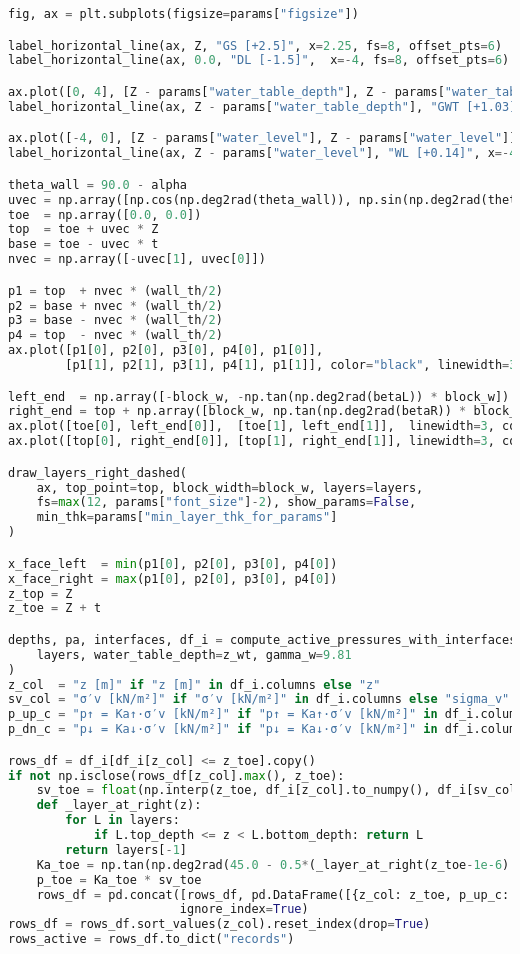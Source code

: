 \begin{lstlisting}[language=Python]
fig, ax = plt.subplots(figsize=params["figsize"])

label_horizontal_line(ax, Z, "GS [+2.5]", x=2.25, fs=8, offset_pts=6)
label_horizontal_line(ax, 0.0, "DL [-1.5]",  x=-4, fs=8, offset_pts=6)

ax.plot([0, 4], [Z - params["water_table_depth"], Z - params["water_table_depth"]], linestyle="--", linewidth=1.5, color="black")
label_horizontal_line(ax, Z - params["water_table_depth"], "GWT [+1.03]", x=2.25, fs=8, offset_pts=6)

ax.plot([-4, 0], [Z - params["water_level"], Z - params["water_level"]], linestyle="--", linewidth=1.5, color="black")
label_horizontal_line(ax, Z - params["water_level"], "WL [+0.14]", x=-4, fs=8, offset_pts=6)

theta_wall = 90.0 - alpha
uvec = np.array([np.cos(np.deg2rad(theta_wall)), np.sin(np.deg2rad(theta_wall))])
toe  = np.array([0.0, 0.0])
top  = toe + uvec * Z
base = toe - uvec * t
nvec = np.array([-uvec[1], uvec[0]])

p1 = top  + nvec * (wall_th/2)
p2 = base + nvec * (wall_th/2)
p3 = base - nvec * (wall_th/2)
p4 = top  - nvec * (wall_th/2)
ax.plot([p1[0], p2[0], p3[0], p4[0], p1[0]],
        [p1[1], p2[1], p3[1], p4[1], p1[1]], color="black", linewidth=3)

left_end  = np.array([-block_w, -np.tan(np.deg2rad(betaL)) * block_w])
right_end = top + np.array([block_w, np.tan(np.deg2rad(betaR)) * block_w])
ax.plot([toe[0], left_end[0]],  [toe[1], left_end[1]],  linewidth=3, color="black")
ax.plot([top[0], right_end[0]], [top[1], right_end[1]], linewidth=3, color="black")

draw_layers_right_dashed(
    ax, top_point=top, block_width=block_w, layers=layers,
    fs=max(12, params["font_size"]-2), show_params=False,
    min_thk=params["min_layer_thk_for_params"]
)

x_face_left  = min(p1[0], p2[0], p3[0], p4[0])
x_face_right = max(p1[0], p2[0], p3[0], p4[0])
z_top = Z
z_toe = Z + t

depths, pa, interfaces, df_i = compute_active_pressures_with_interfaces(
    layers, water_table_depth=z_wt, gamma_w=9.81
)
z_col  = "z [m]" if "z [m]" in df_i.columns else "z"
sv_col = "σ′v [kN/m²]" if "σ′v [kN/m²]" in df_i.columns else "sigma_v"
p_up_c = "p↑ = Ka↑·σ′v [kN/m²]" if "p↑ = Ka↑·σ′v [kN/m²]" in df_i.columns else "p_from_above"
p_dn_c = "p↓ = Ka↓·σ′v [kN/m²]" if "p↓ = Ka↓·σ′v [kN/m²]" in df_i.columns else "p_from_below"

rows_df = df_i[df_i[z_col] <= z_toe].copy()
if not np.isclose(rows_df[z_col].max(), z_toe):
    sv_toe = float(np.interp(z_toe, df_i[z_col].to_numpy(), df_i[sv_col].to_numpy()))
    def _layer_at_right(z):
        for L in layers:
            if L.top_depth <= z < L.bottom_depth: return L
        return layers[-1]
    Ka_toe = np.tan(np.deg2rad(45.0 - 0.5*(_layer_at_right(z_toe-1e-6).params.phi or 0.0)))**2
    p_toe = Ka_toe * sv_toe
    rows_df = pd.concat([rows_df, pd.DataFrame([{z_col: z_toe, p_up_c: p_toe, p_dn_c: p_toe}])],
                        ignore_index=True)
rows_df = rows_df.sort_values(z_col).reset_index(drop=True)
rows_active = rows_df.to_dict("records")


\end{lstlisting}

